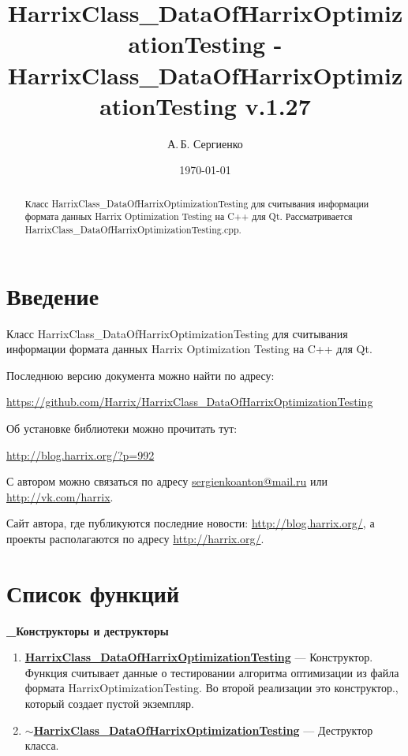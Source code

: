 \documentclass[a4paper,12pt]{article}
\title{Har\-rix\-Class\_Da\-ta\-Of\-Har\-rix\-Op\-ti\-mi\-za\-ti\-on\-Test\-ing - Har\-rix\-Class\_Da\-ta\-Of\-Har\-rix\-Op\-ti\-mi\-za\-ti\-on\-Test\-ing v.1.27}
\author{А.\,Б. Сергиенко}
\date{\today}
\begin{document}


\maketitle

\begin{abstract}
Класс HarrixClass\_DataOfHarrixOptimizationTesting для считывания информации формата данных Harrix Optimization Testing на C++ для Qt. Рассматривается HarrixClass\_DataOfHarrixOptimizationTesting.cpp.
\end{abstract}

\tableofcontents

\newpage

\section{Введение}

Класс HarrixClass\_DataOfHarrixOptimizationTesting для считывания информации формата данных Harrix Optimization Testing на C++ для Qt.

Последнюю версию документа можно найти по адресу:

\href{https://github.com/Harrix/HarrixClass\_DataOfHarrixOptimizationTesting}{https://github.com/Harrix/HarrixClass\_DataOfHarrixOptimizationTesting}

Об установке библиотеки можно прочитать тут:

\href{http://blog.harrix.org/?p=992}{http://blog.harrix.org/?p=992}

С автором можно связаться по адресу \href{mailto:sergienkoanton@mail.ru}{sergienkoanton@mail.ru} или  \href{http://vk.com/harrix}{http://vk.com/harrix}.

Сайт автора, где публикуются последние новости: \href{http://blog.harrix.org/}{http://blog.harrix.org/}, а проекты располагаются по адресу \href{http://harrix.org/}{http://harrix.org/}.

\newpage
\section{Список функций}\label{section_listfunctions}
\textbf{\_Конструкторы и деструкторы}
\begin{enumerate}

\item \textbf{\hyperref[HarrixClass_DataOfHarrixOptimizationTesting]{HarrixClass\_DataOfHarrixOptimizationTesting}} --- Конструктор. Функция считывает данные о тестировании алгоритма оптимизации из файла формата HarrixOptimizationTesting. Во второй реализации это конструктор., который создает пустой экземпляр.

\item \textbf{\hyperref[tildaHarrixClass_DataOfHarrixOptimizationTesting]{$\sim$HarrixClass\_DataOfHarrixOptimizationTesting}} --- Деструктор класса.

\end{enumerate}
\end{document}
